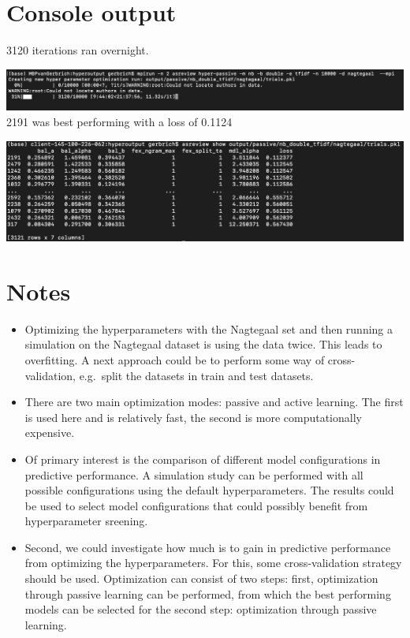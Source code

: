 \documentclass[
]{book}
\begin{document}
\pagebreak

\hypertarget{console-output}{%
\section{Console output}\label{console-output}}

3120 iterations ran overnight.

\includegraphics{figs/myfirstsim/computation.png}
2191 was best performing with a loss of 0.1124

\includegraphics{figs/myfirstsim/optmizationresult.png}

\hypertarget{notes}{%
\section{Notes}\label{notes}}

\begin{itemize}
\item
  Optimizing the hyperparameters with the Nagtegaal set and then running a simulation on the Nagtegaal dataset is using the data twice.
  This leads to overfitting. A next approach could be to perform some way of cross-validation, e.g.~split the datasets in train and test datasets.
\item
  There are two main optimization modes: passive and active learning.
  The first is used here and is relatively fast, the second is more computationally expensive.
\item
  Of primary interest is the comparison of different model configurations in predictive performance.
  A simulation study can be performed with all possible configurations using the default hyperparameters.
  The results could be used to select model configurations that could possibly benefit from hyperparameter sreening.
\item
  Second, we could investigate how much is to gain in predictive performance from optimizing the hyperparameters.
  For this, some cross-validation strategy should be used.
  Optimization can consist of two steps:
  first, optimization through passive learning can be performed, from which the best performing models can be selected for the second step:
  optimization through passive learning.
\end{itemize}
\end{document}
